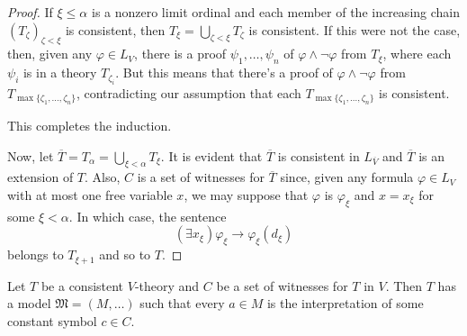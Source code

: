\documentclass{scrartcl}
\renewcommand{\phi}{\varphi}
\newcommand{\FM}{\mathfrak{M}}
\begin{document}
\begin{proof}
If $\xi\le\alpha$ is a nonzero limit ordinal and each member of the increasing chain $(T_\zeta)_{\zeta<\xi}$ is consistent, then $T_\xi = \bigcup_{\zeta<\xi}T_\zeta$ is consistent. If this were not the case, then, given any $\phi\in L_V$, there is a proof $\psi_1,\dots,\psi_n$ of $\phi\wedge\neg\phi$ from $T_\xi$, where each $\psi_i$ is in a theory $T_{\zeta_i}$. But this means that there's a proof of $\phi\wedge\neg\phi$ from $T_{\max\{\zeta_1,\dots,\zeta_n\}}$, contradicting our assumption that each $T_{\max\{\zeta_1,\dots,\zeta_n\}}$ is consistent.

This completes the induction.

Now, let $\overline{T} = T_\alpha= \bigcup_{\xi<\alpha}T_\xi$. It is evident that $\overline{T}$ is consistent in $L_{\overline{V}}$ and $\overline{T}$ is an extension of $T$. Also, $C$ is a set of witnesses for $\overline{T}$ since, given any formula $\phi\in L_V$ with at most one free variable $x$, we may suppose that $\phi$ is $\phi_{\xi}$ and $x = x_\xi$ for some $\xi <\alpha$. In which case, the sentence 
\[
(\exists x_\xi)\phi_\xi \rightarrow \phi_\xi (d_\xi)
\]
belongs to $T_{\xi +1}$ and so to $T$.
\end{proof}


\begin{lemma}
\label{L:Henkin}
Let $T$ be a consistent $V$-theory and $C$ be a set of witnesses for $T$ in $V$. Then $T$ has a model $\FM = (M,\dots)$ such that every $a\in M$ is the interpretation of some constant symbol $c\in C$.
\end{lemma}
\end{document}
